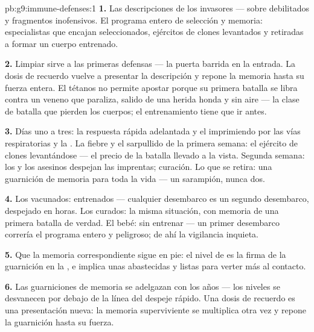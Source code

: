 \begin{solution}{pb:g9:immune-defenses:1}
\textbf{1.} Las descripciones de los invasores ---  sobre
 debilitados y fragmentos inofensivos. El programa entero de
selección y memoria: especialistas que encajan seleccionados, ejércitos
de clones levantados y  retiradas a formar un cuerpo
entrenado.

\textbf{2.} Limpiar sirve a las primeras defensas --- la puerta barrida
en la entrada. La dosis de recuerdo vuelve a presentar la descripción y
repone la memoria hasta su fuerza entera. El tétanos no permite apostar
porque su primera batalla se libra contra un veneno que paraliza,
salido de una herida honda y sin aire --- la clase de batalla que
pierden los cuerpos; el entrenamiento tiene que ir antes.

\textbf{3.} Días uno a tres: la respuesta rápida adelantada y el 
imprimiendo por las vías respiratorias y la . La fiebre y el
sarpullido de la primera semana: el ejército de clones levantándose ---
el precio de la batalla llevado a la vista. Segunda semana: los
 y los asesinos despejan las imprentas; curación. Lo que se
retira: una guarnición de memoria para toda la vida --- un sarampión,
nunca dos.

\textbf{4.} Los vacunados: entrenados --- cualquier desembarco es un
segundo desembarco, despejado en horas. Los curados: la misma
situación, con memoria de una primera batalla de verdad. El bebé: sin
entrenar --- un primer desembarco correría el programa entero y
peligroso; de ahí la vigilancia inquieta.

\textbf{5.} Que la memoria correspondiente sigue en pie: el nivel de
 es la firma de la guarnición en la , e implica unas
 abastecidas y listas para verter más al contacto.

\textbf{6.} Las guarniciones de memoria se adelgazan con los años ---
los niveles se desvanecen por debajo de la línea del despeje rápido.
Una dosis de recuerdo es una presentación nueva: la memoria
superviviente se multiplica otra vez y repone la guarnición hasta su
fuerza.


\end{solution}

